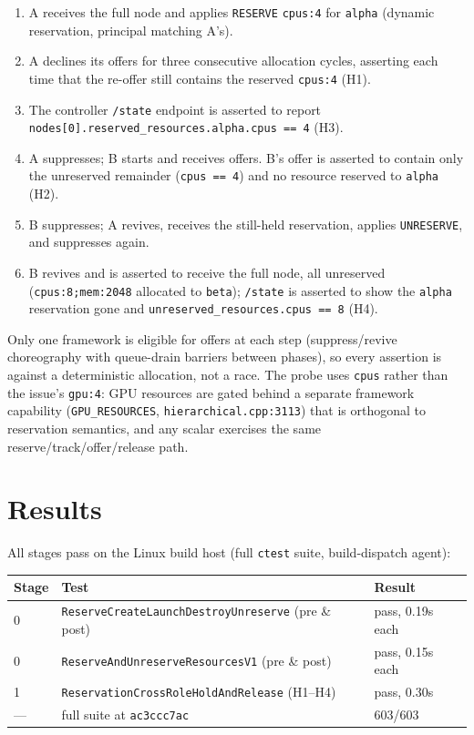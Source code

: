\documentclass[11pt]{article}
\newcommand{\code}[1]{\texttt{#1}}
\begin{document}
\begin{enumerate}
\item A receives the full node and applies \code{RESERVE} \code{cpus:4} for
  \code{alpha} (dynamic reservation, principal matching A's).
\item A declines its offers for three consecutive allocation cycles,
  asserting each time that the re-offer still contains the reserved
  \code{cpus:4} (H1).
\item The controller \code{/state} endpoint is asserted to report
  \code{nodes[0].reserved\_resources.alpha.cpus == 4} (H3).
\item A suppresses; B starts and receives offers. B's offer is asserted to
  contain only the unreserved remainder (\code{cpus == 4}) and no resource
  reserved to \code{alpha} (H2).
\item B suppresses; A revives, receives the still-held reservation, applies
  \code{UNRESERVE}, and suppresses again.
\item B revives and is asserted to receive the full node, all unreserved
  (\code{cpus:8;mem:2048} allocated to \code{beta}); \code{/state} is
  asserted to show the \code{alpha} reservation gone and
  \code{unreserved\_resources.cpus == 8} (H4).
\end{enumerate}

Only one framework is eligible for offers at each step (suppress/revive
choreography with queue-drain barriers between phases), so every assertion
is against a deterministic allocation, not a race. The probe uses
\code{cpus} rather than the issue's \code{gpu:4}: GPU resources are gated
behind a separate framework capability (\code{GPU\_RESOURCES},
\code{hierarchical.cpp:3113}) that is orthogonal to reservation semantics,
and any scalar exercises the same reserve/track/offer/release path.

\section{Results}

All stages pass on the Linux build host (full \code{ctest} suite,
build-dispatch agent):

\begin{center}
\begin{tabular}{lll}
\toprule
Stage & Test & Result \\
\midrule
0 & \code{ReserveCreateLaunchDestroyUnreserve} (pre \& post) & pass, 0.19s each \\
0 & \code{ReserveAndUnreserveResourcesV1} (pre \& post) & pass, 0.15s each \\
1 & \code{ReservationCrossRoleHoldAndRelease} (H1--H4) & pass, 0.30s \\
--- & full suite at \code{ac3ccc7ac} & 603/603 \\
\bottomrule
\end{tabular}
\end{center}
\end{document}
